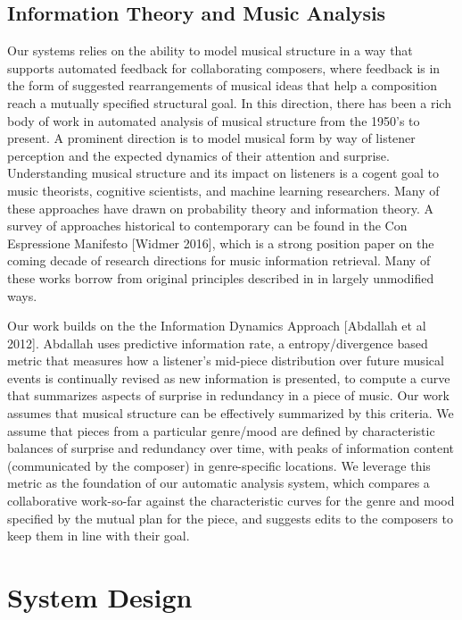 \documentclass[final,authoryear,5p,times,twocolumn]{elsarticle}
\begin{document}
\subsection{Information Theory and Music Analysis}

Our systems relies on the ability to model musical structure in a way that supports automated feedback for collaborating composers, where feedback is in the form of suggested rearrangements of musical ideas that help a composition reach a mutually specified structural goal. In this direction, there has been a rich body of work in automated analysis of musical structure from the 1950's to present. A prominent direction is to model musical form by way of listener perception and the expected dynamics of their attention and surprise. Understanding musical structure and its impact on listeners is a cogent goal to music theorists, cognitive scientists, and machine learning researchers. Many of these approaches have drawn on probability theory and information theory. A survey of approaches historical to contemporary can be found in the Con Espressione Manifesto [Widmer 2016], which is a strong position paper on the coming decade of research directions for music information retrieval. Many of these works borrow from original principles described in \cite{shannon} in largely unmodified ways.

Our work builds on the the Information Dynamics Approach [Abdallah et al 2012]. Abdallah uses predictive information rate, a entropy/divergence based metric that measures how a listener's mid-piece distribution over future musical events is continually revised as new information is presented, to compute a curve that summarizes aspects of surprise in redundancy in a piece of music. Our work assumes that musical structure can be effectively summarized by this criteria. We assume that pieces from a particular genre/mood are defined by characteristic balances of surprise and redundancy over time, with peaks of information content (communicated by the composer) in genre-specific locations. We leverage this metric as the foundation of our automatic analysis system, which compares a collaborative work-so-far against the characteristic curves for the genre and mood specified by the mutual plan for the piece, and suggests edits to the composers to keep them in line with their goal.


\section{System Design}
\end{document}
